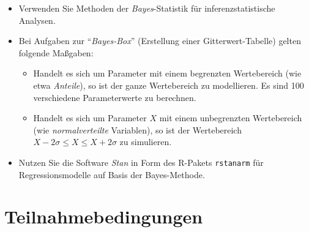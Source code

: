 \documentclass[
  a4paper,
  DIV=11]{scrreprt}
\providecommand{\tightlist}{%
  \setlength{\itemsep}{0pt}\setlength{\parskip}{0pt}}\usepackage{longtable,booktabs,array}
\theoremstyle{definition}
\theoremstyle{remark}
\begin{document}
\begin{itemize}
\tightlist
\item
  Verwenden Sie Methoden der \emph{Bayes}-Statistik für
  inferenzstatistische Analysen.
\item
  Bei Aufgaben zur ``\emph{Bayes-Box}'' (Erstellung einer
  Gitterwert-Tabelle) gelten folgende Maßgaben:

  \begin{itemize}
  \tightlist
  \item
    Handelt es sich um Parameter mit einem begrenzten Wertebereich (wie
    etwa \emph{Anteile}), so ist der ganze Wertebereich zu modellieren.
    Es sind 100 verschiedene Parameterwerte zu berechnen.
  \item
    Handelt es sich um Parameter \(X\) mit einem unbegrenzten
    Wertebereich (wie \emph{normalverteilte} Variablen), so ist der
    Wertebereich \(X-2\sigma \le X \le X+2\sigma\) zu simulieren.
  \end{itemize}
\item
  Nutzen Sie die Software \emph{Stan} in Form des R-Pakets
  \texttt{rstanarm} für Regressionsmodelle auf Basis der Bayes-Methode.
\end{itemize}

\hypertarget{teilnahmebedingungen}{%
\section{Teilnahmebedingungen}\label{teilnahmebedingungen}}
\end{document}
